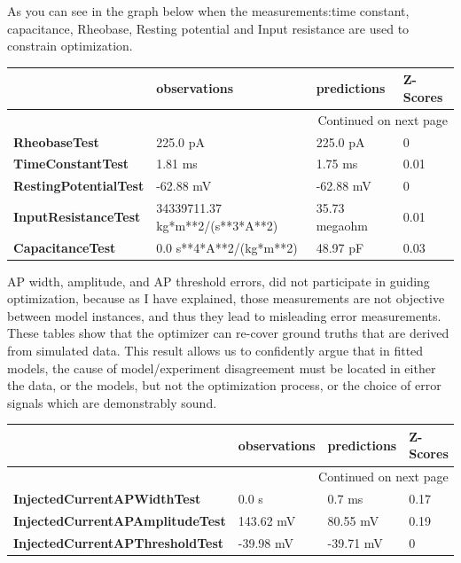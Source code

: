 As you can see in the graph below when the measurements:time constant, capacitance, Rheobase, Resting potential and Input resistance are used to constrain optimization. 

\begin{longtable}{llll}
\toprule
{} &                     observations &    predictions & Z-Scores \\
\midrule
\endhead
\midrule
\multicolumn{4}{r}{{Continued on next page}} \\
\midrule
\endfoot

\bottomrule
\endlastfoot
\textbf{RheobaseTest                  } &                         225.0 pA &       225.0 pA &        0 \\
\textbf{TimeConstantTest              } &                          1.81 ms &        1.75 ms &     0.01 \\
\textbf{RestingPotentialTest          } &                        -62.88 mV &      -62.88 mV &        0 \\
\textbf{InputResistanceTest           } &  34339711.37 kg*m**2/(s**3*A**2) &  35.73 megaohm &     0.01 \\
\textbf{CapacitanceTest               } &          0.0 s**4*A**2/(kg*m**2) &       48.97 pF &     0.03 \\
\end{longtable}

AP width, amplitude, and AP threshold errors, did not participate in guiding optimization, because as I have explained, those measurements are not objective between model instances, and thus they lead to misleading error measurements. These tables show that the optimizer can re-cover ground truths that are derived from simulated data. This result allows us to confidently argue that in fitted models, the cause of model/experiment disagreement must be located in either the data, or the models, but not the optimization process, or the choice of error signals which are demonstrably sound.

\begin{longtable}{llll}
\toprule
{} &                     observations &    predictions & Z-Scores \\
\midrule
\endhead
\midrule
\multicolumn{4}{r}{{Continued on next page}} \\
\midrule
\endfoot
\textbf{InjectedCurrentAPWidthTest    } &                            0.0 s &         0.7 ms &     0.17 \\
\textbf{InjectedCurrentAPAmplitudeTest} &                        143.62 mV &       80.55 mV &     0.19 \\
\textbf{InjectedCurrentAPThresholdTest} &                        -39.98 mV &      -39.71 mV &        0 \\
\end{longtable}

